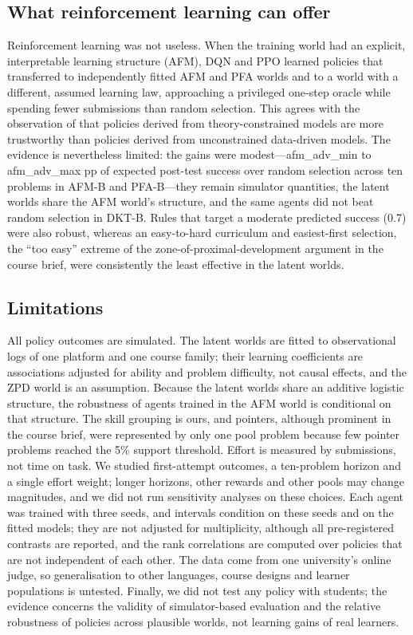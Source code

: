 \subsection{What reinforcement learning can offer}

Reinforcement learning was not useless. When the training world had an explicit, interpretable learning structure (AFM), DQN and PPO learned policies that transferred to independently fitted AFM and PFA worlds and to a world with a different, assumed learning law, approaching a privileged one-step oracle while spending fewer submissions than random selection. This agrees with the observation of \citet{doroudi2019reward} that policies derived from theory-constrained models are more trustworthy than policies derived from unconstrained data-driven models. The evidence is nevertheless limited: the gains were modest---{{afm_adv_min}} to {{afm_adv_max}} pp of expected post-test success over random selection across ten problems in AFM-B and PFA-B---they remain simulator quantities, the latent worlds share the AFM world's structure, and the same agents did not beat random selection in DKT-B. Rules that target a moderate predicted success (0.7) were also robust, whereas an easy-to-hard curriculum and easiest-first selection, the ``too easy'' extreme of the zone-of-proximal-development argument in the course brief, were consistently the least effective in the latent worlds.

\subsection{Limitations}

All policy outcomes are simulated. The latent worlds are fitted to observational logs of one platform and one course family; their learning coefficients are associations adjusted for ability and problem difficulty, not causal effects, and the ZPD world is an assumption. Because the latent worlds share an additive logistic structure, the robustness of agents trained in the AFM world is conditional on that structure. The skill grouping is ours, and pointers, although prominent in the course brief, were represented by only one pool problem because few pointer problems reached the 5\% support threshold. Effort is measured by submissions, not time on task. We studied first-attempt outcomes, a ten-problem horizon and a single effort weight; longer horizons, other rewards and other pools may change magnitudes, and we did not run sensitivity analyses on these choices. Each agent was trained with three seeds, and intervals condition on these seeds and on the fitted models; they are not adjusted for multiplicity, although all pre-registered contrasts are reported, and the rank correlations are computed over policies that are not independent of each other. The data come from one university's online judge, so generalisation to other languages, course designs and learner populations is untested. Finally, we did not test any policy with students; the evidence concerns the validity of simulator-based evaluation and the relative robustness of policies across plausible worlds, not learning gains of real learners.
